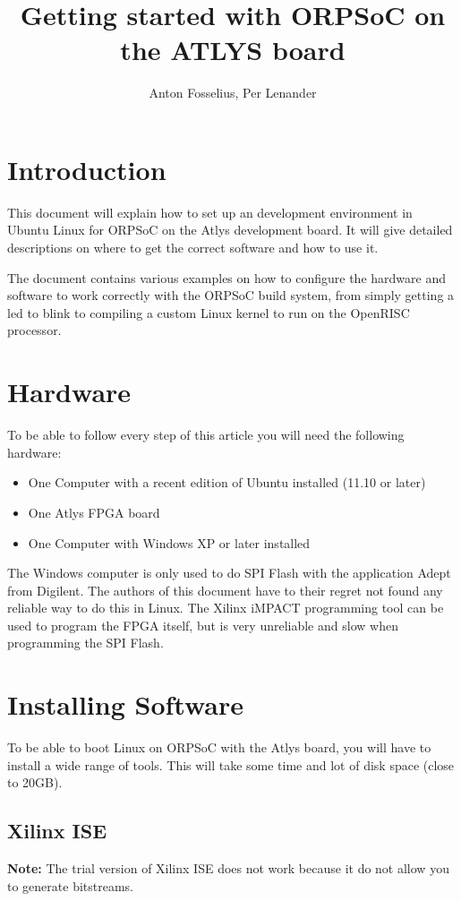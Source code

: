 \documentclass[10pt,a4paper]{article}
\title{Getting started with ORPSoC on the ATLYS board}
\author{Anton Fosselius, Per Lenander}
\begin{document}
\maketitle
\newpage

\tableofcontents
\newpage

\section{Introduction}
This document will explain how to set up an development environment in Ubuntu Linux for ORPSoC on the Atlys development board. It will give detailed descriptions on where to get the correct software and how to use it.

The document contains various examples on how to configure the hardware and software to work correctly with the ORPSoC build system, from simply getting a led to blink to compiling a custom Linux kernel to run on the OpenRISC processor.

\section{Hardware}
To be able to follow every step of this article you will need the following hardware:

\begin{itemize}
	\item One Computer with a recent edition of Ubuntu installed (11.10 or later)
	\item One Atlys FPGA board
	\item One Computer with Windows XP or later installed
\end{itemize}

The Windows computer is only used to do SPI Flash with the application Adept from Digilent. The authors of this document have to their regret not found any reliable way to do this in Linux. The Xilinx iMPACT programming tool can be used to program the FPGA itself, but is very unreliable and slow when programming the SPI Flash.

\section{Installing Software}
To be able to boot Linux on ORPSoC with the Atlys board, you will have to install a wide range of tools. This will take some time and lot of disk space (close to 20GB).

\subsection{Xilinx ISE}
\textbf{Note:} The trial version of Xilinx ISE does not work because it do not allow you to generate bitstreams.
\end{document}
